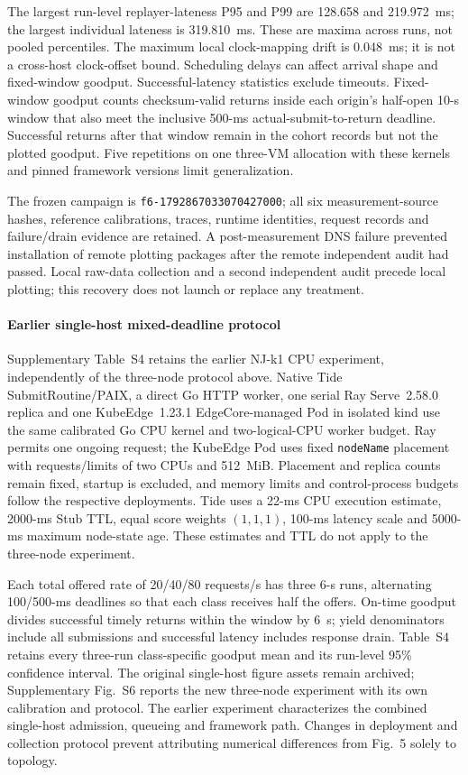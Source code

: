 The largest run-level replayer-lateness P95 and P99 are 128.658 and 219.972~ms; the largest individual lateness is 319.810~ms. These are maxima across runs, not pooled percentiles. The maximum local clock-mapping drift is 0.048~ms; it is not a cross-host clock-offset bound. Scheduling delays can affect arrival shape and fixed-window goodput. Successful-latency statistics exclude timeouts. Fixed-window goodput counts checksum-valid returns inside each origin's half-open 10-s window that also meet the inclusive 500-ms actual-submit-to-return deadline. Successful returns after that window remain in the cohort records but not the plotted goodput. Five repetitions on one three-VM allocation with these kernels and pinned framework versions limit generalization.

The frozen campaign is \texttt{f6-1792867033070427000}; all six measurement-source hashes, reference calibrations, traces, runtime identities, request records and failure/drain evidence are retained. A post-measurement DNS failure prevented installation of remote plotting packages after the remote independent audit had passed. Local raw-data collection and a second independent audit precede local plotting; this recovery does not launch or replace any treatment.

\paragraph{Earlier single-host mixed-deadline protocol}
Supplementary Table~S4 retains the earlier NJ-k1 CPU experiment, independently of the three-node protocol above. Native Tide SubmitRoutine/PAIX, a direct Go HTTP worker, one serial Ray Serve~2.58.0 replica and one KubeEdge~1.23.1 EdgeCore-managed Pod in isolated kind use the same calibrated Go CPU kernel and two-logical-CPU worker budget. Ray permits one ongoing request; the KubeEdge Pod uses fixed \texttt{nodeName} placement with requests/limits of two CPUs and 512~MiB. Placement and replica counts remain fixed, startup is excluded, and memory limits and control-process budgets follow the respective deployments. Tide uses a 22-ms CPU execution estimate, 2000-ms Stub TTL, equal score weights $(1,1,1)$, 100-ms latency scale and 5000-ms maximum node-state age. These estimates and TTL do not apply to the three-node experiment.

Each total offered rate of 20/40/80 requests/s has three 6-s runs, alternating 100/500-ms deadlines so that each class receives half the offers. On-time goodput divides successful timely returns within the window by 6~s; yield denominators include all submissions and successful latency includes response drain. Table~S4 retains every three-run class-specific goodput mean and its run-level 95\% confidence interval. The original single-host figure assets remain archived; Supplementary Fig.~S6 reports the new three-node experiment with its own calibration and protocol. The earlier experiment characterizes the combined single-host admission, queueing and framework path. Changes in deployment and collection protocol prevent attributing numerical differences from Fig.~5 solely to topology.
